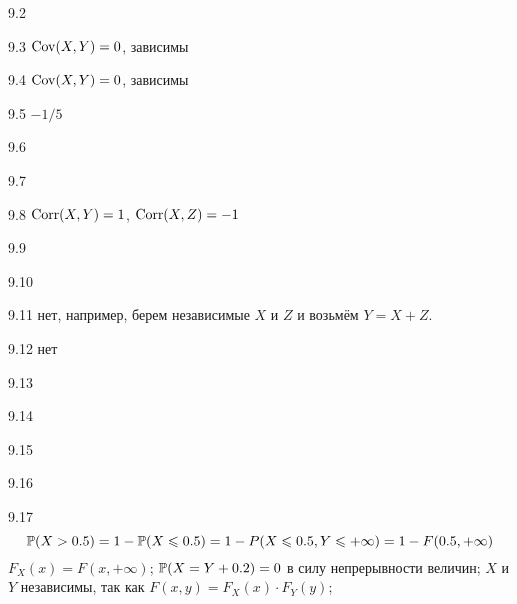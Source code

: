 \protect \hypertarget {soln:9.2}{}
\begin{solution}{{9.2}}
\end{solution}
\protect \hypertarget {soln:9.3}{}
\begin{solution}{{9.3}}
      $\Cov(X,Y)=0$, зависимы
\end{solution}
\protect \hypertarget {soln:9.4}{}
\begin{solution}{{9.4}}
  $\Cov(X,Y)=0$, зависимы
\end{solution}
\protect \hypertarget {soln:9.5}{}
\begin{solution}{{9.5}}
  $-1/5$
\end{solution}
\protect \hypertarget {soln:9.6}{}
\begin{solution}{{9.6}}
\end{solution}
\protect \hypertarget {soln:9.7}{}
\begin{solution}{{9.7}}
\end{solution}
\protect \hypertarget {soln:9.8}{}
\begin{solution}{{9.8}}
$\Corr(X,Y)=1$, $\Corr(X,Z)=-1$
\end{solution}
\protect \hypertarget {soln:9.9}{}
\begin{solution}{{9.9}}
\end{solution}
\protect \hypertarget {soln:9.10}{}
\begin{solution}{{9.10}}
\end{solution}
\protect \hypertarget {soln:9.11}{}
\begin{solution}{{9.11}}
  нет, например, берем независимые $X$ и $Z$ и возьмём $Y=X+Z$.
\end{solution}
\protect \hypertarget {soln:9.12}{}
\begin{solution}{{9.12}}
нет
\end{solution}
\protect \hypertarget {soln:9.13}{}
\begin{solution}{{9.13}}
\end{solution}
\protect \hypertarget {soln:9.14}{}
\begin{solution}{{9.14}}
\end{solution}
\protect \hypertarget {soln:9.15}{}
\begin{solution}{{9.15}}
\end{solution}
\protect \hypertarget {soln:9.16}{}
\begin{solution}{{9.16}}
\end{solution}
\protect \hypertarget {soln:9.17}{}
\begin{solution}{{9.17}}
  \[
  \P(X>0.5) = 1 - \P(X\leq 0.5) = 1 - P(X\leq 0.5, Y\leq +\infty) = 1 - F(0.5, +\infty)
  \]
  $F_X(x)=F(x, +\infty)$; $\P(X=Y+0.2)=0$ в силу непрерывности величин; $X$ и $Y$ независимы, так как $F(x,y)=F_X(x)\cdot F_Y(y)$;
\end{solution}

